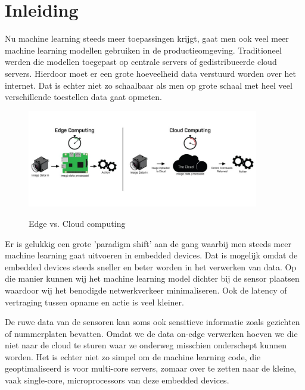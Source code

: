 \section{Inleiding}

Nu machine learning steeds meer toepassingen krijgt, gaat men ook veel meer machine learning modellen gebruiken in de productieomgeving.
Traditioneel werden die modellen toegepast op centrale servers of gedistribueerde cloud servers. Hierdoor moet er een grote hoeveelheid data verstuurd worden over het internet.
Dat is echter niet zo schaalbaar als men op grote schaal met heel veel verschillende toestellen data gaat opmeten. %

\begin{figure}[ht]
	\centering
	\includegraphics[width=0.9\textwidth]{figuren/iisedgecomputing.jpg}
	\caption{Edge vs. Cloud computing}
	\cite{flir-edge-computing}
	\label{fig:edge-vs-cloud}
\end{figure}

Er is gelukkig een grote 'paradigm shift' aan de gang waarbij men steeds meer machine learning gaat uitvoeren in embedded devices.
Dat is mogelijk omdat de embedded devices steeds sneller en beter worden in het verwerken van data.
Op die manier kunnen wij het machine learning model dichter bij de sensor plaatsen waardoor wij het benodigde netwerkverkeer minimaliseren.
Ook de latency of vertraging tussen opname en actie is veel kleiner. \cite{flir-edge-computing}

De ruwe data van de sensoren kan soms ook sensitieve informatie zoals gezichten of nummerplaten bevatten. Omdat we de data on-edge verwerken hoeven we die niet naar de cloud te sturen waar ze onderweg misschien onderschept kunnen worden. \cite{flir-edge-computing}
Het is echter niet zo simpel om de machine learning code, die geoptimaliseerd is voor multi-core servers, zomaar over te zetten naar de kleine, vaak single-core, microprocessors van deze embedded devices.

